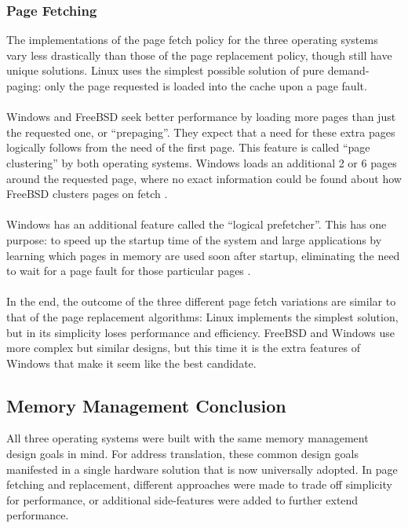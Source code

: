 \documentclass[10pt,draftclsnofoot,onecolumn]{article}
\begin{document}
\subsubsection{Page Fetching}

The implementations of the page fetch policy for the three operating systems vary less drastically than those of the page replacement policy, though still have unique solutions. Linux uses the simplest possible solution of pure demand-paging: only the page requested is loaded into the cache upon a page fault. 
\\\\
Windows and FreeBSD seek better performance by loading more pages than just the requested one, or “prepaging”. They expect that a need for these extra pages logically follows from the need of the first page. This feature is called “page clustering” by both operating systems. Windows loads an additional 2 or 6 pages around the requested page, where no exact information could be found about how FreeBSD clusters pages on fetch \cite{Wandos, BSDM}.
\\\\
Windows has an additional feature called the “logical prefetcher”. This has one purpose: to speed up the startup time of the system and large applications by learning which pages in memory are used soon after startup, eliminating the need to wait for a page fault for those particular pages \cite{Wandos}.
\\\\
In the end, the outcome of the three different page fetch variations are similar to that of the page replacement algorithms: Linux implements the simplest solution, but in its simplicity loses performance and efficiency. FreeBSD and Windows use more complex but similar designs, but this time it is the extra features of Windows that make it seem like the best candidate. 

\subsection{Memory Management Conclusion}

All three operating systems were built with the same memory management design goals in mind. For address translation, these common design goals manifested in a single hardware solution that is now universally adopted. In page fetching and replacement, different approaches were made to trade off simplicity for performance, or additional side-features were added to further extend performance.
\end{document}
